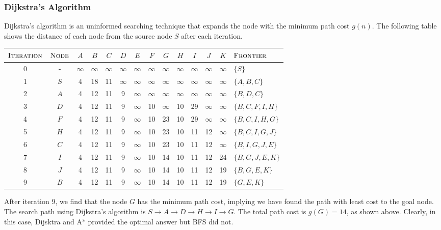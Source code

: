 \documentclass[12pt]{article}
\begin{document}
    \subsubsection*{Dijkstra's Algorithm}
    Dijkstra's algorithm is an uninformed searching technique that expands the node with the minimum
    path cost $g(n)$. The following table shows the distance of each node from the source node $S$
    after each iteration.
    \begin{center}
        \begin{tabular}{c|c|ccccccccccc|l}
            $\textsc{Iteration}$ & $\textsc{Node}$ & $A$ & $B$ & $C$ & $D$ & $E$ & $F$ & $G$ & $H$ & $I$ & $J$ & $K$ & $\textsc{Frontier}$ \\
            \hline
            0 & - & $\infty$ & $\infty$ & $\infty$ & $\infty$ & $\infty$ & $\infty$ & $\infty$ & $\infty$ & $\infty$ & $\infty$ & $\infty$ & $\{ S \}$ \\
            1 & $S$ & 4 & 18 & 11 & $\infty$ & $\infty$ & $\infty$ & $\infty$ & $\infty$ & $\infty$ & $\infty$ & $\infty$ & $\{ A, B, C \}$ \\
            2 & $A$ & 4 & 12 & 11 & 9 & $\infty$ & $\infty$ & $\infty$ & $\infty$ & $\infty$ & $\infty$ & $\infty$ & $\{ B, D, C \}$ \\
            3 & $D$ & 4 & 12 & 11 & 9 & $\infty$ & 10 & $\infty$ & 10 & 29 & $\infty$ & $\infty$ & $\{ B, C, F, I, H \}$ \\
            4 & $F$ & 4 & 12 & 11 & 9 & $\infty$ & 10 & 23 & 10 & 29 & $\infty$ & $\infty$ & $\{ B, C, I, H, G \}$ \\
            5 & $H$ & 4 & 12 & 11 & 9 & $\infty$ & 10 & 23 & 10 & 11 & 12 & $\infty$ & $\{ B, C, I, G, J \}$ \\
            6 & $C$ & 4 & 12 & 11 & 9 & $\infty$ & 10 & 23 & 10 & 11 & 12 & $\infty$ & $\{ B, I, G, J, E \}$ \\
            7 & $I$ & 4 & 12 & 11 & 9 & $\infty$ & 10 & 14 & 10 & 11 & 12 & 24 & $\{ B, G, J, E, K \}$ \\
            8 & $J$ & 4 & 12 & 11 & 9 & $\infty$ & 10 & 14 & 10 & 11 & 12 & 19 & $\{ B, G, E, K \}$ \\
            9 & $B$ & 4 & 12 & 11 & 9 & $\infty$ & 10 & 14 & 10 & 11 & 12 & 19 & $\{ G, E, K \}$
        \end{tabular}
    \end{center}
    After iteration 9, we find that the node $G$ has the minimum path cost, implying we have found
    the path with least cost to the goal node. The search path using Dijkstra's algorithm is
    $S \rightarrow A \rightarrow D \rightarrow H \rightarrow I \rightarrow G$. The total path cost
    is $g(G) = 14$, as shown above. Clearly, in this case, Dijsktra and A* provided the optimal answer
    but BFS did not.
\end{document}
